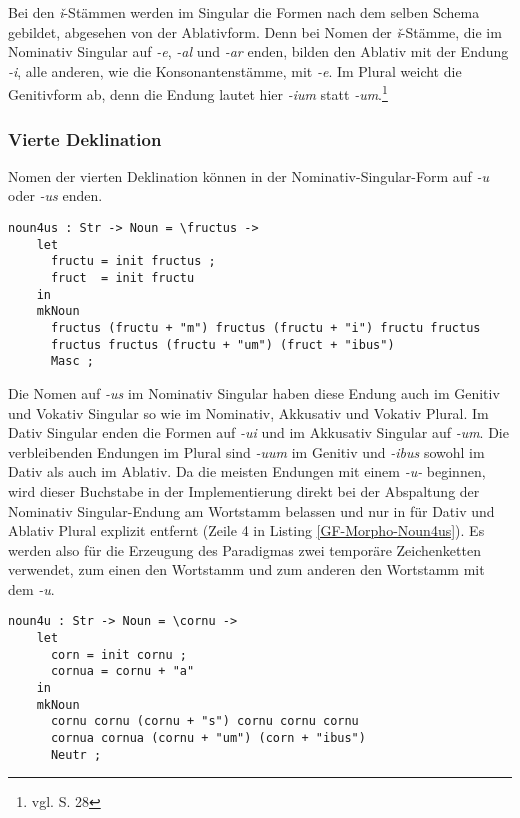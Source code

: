 Bei den \textit{ǐ}-Stämmen werden im Singular die Formen nach dem selben Schema gebildet, abgesehen von der Ablativform. Denn bei Nomen der \textit{ǐ}-Stämme, die im Nominativ Singular auf \textit{-e}, \textit{-al} und \textit{-ar} enden, bilden den Ablativ mit der Endung \textit{-i}, alle anderen, wie die Konsonantenstämme, mit \textit{-e}. Im Plural weicht die Genitivform ab, denn die Endung lautet hier \textit{-ium} statt \textit{-um}.\footnote{vgl. \cite{BAYER-LINDAUER1994} S. 28} \par
\FloatBarrier
\subsubsection{Vierte Deklination}
Nomen der vierten Deklination können in der Nominativ-Singular-Form auf \textit{-u} oder \textit{-us} enden. \par
\begin{lstlisting}[float=h!tp,caption={Die Deklinationsfunktionen für die Nomen der vierten Deklination auf \textit{-us} (vgl. \textbf{MorphoLat.gf})},label={GF-Morpho-Noun4us},basicstyle=\small]
  noun4us : Str -> Noun = \fructus -> 
    let
      fructu = init fructus ;
      fruct  = init fructu
    in
    mkNoun
      fructus (fructu + "m") fructus (fructu + "i") fructu fructus
      fructus fructus (fructu + "um") (fruct + "ibus")
      Masc ;
\end{lstlisting}
Die Nomen auf \textit{-us} im Nominativ Singular haben diese Endung auch im Genitiv und Vokativ Singular so wie im Nominativ, Akkusativ und Vokativ Plural. Im Dativ Singular enden die Formen auf \textit{-ui} und im Akkusativ Singular auf \textit{-um}. Die verbleibenden Endungen im Plural sind \textit{-uum} im Genitiv und \textit{-ibus} sowohl im Dativ als auch im Ablativ. Da die meisten Endungen mit einem \textit{-u-} beginnen, wird dieser Buchstabe in der Implementierung direkt bei der Abspaltung der Nominativ Singular-Endung am Wortstamm belassen und nur in für Dativ und Ablativ Plural explizit entfernt (Zeile 4 in Listing \ref{GF-Morpho-Noun4us}). Es werden also für die Erzeugung des Paradigmas zwei temporäre Zeichenketten verwendet, zum einen den Wortstamm und zum anderen den Wortstamm mit dem \textit{-u}. \par
\begin{lstlisting}[float=h!tp,caption={Die Deklinationsfunktionen für die Nomen der vierten Deklination auf \textit{-u} (vgl. \textbf{MorphoLat.gf})},label={GF-Morpho-Noun4u},basicstyle=\small]
  noun4u : Str -> Noun = \cornu -> 
    let
      corn = init cornu ;
      cornua = cornu + "a"
    in
    mkNoun
      cornu cornu (cornu + "s") cornu cornu cornu
      cornua cornua (cornu + "um") (corn + "ibus")
      Neutr ;
\end{lstlisting}
